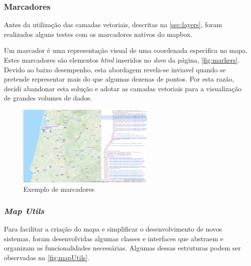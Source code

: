 \clearpage
\subsubsection{\textbf{Marcadores}}\label{sec:markers}
Antes da utilização das camadas vetoriais, descritas na \ref{sec:layers}, foram realizados alguns testes com os marcadores nativos do mapbox. 

Um marcador é uma representação visual de uma coordenada especifica no mapa. Estes marcadores são elementos \textit{html} inseridos no \textit{\acs{dom}} da página, \autoref{fig:markers}. Devido ao baixo desempenho, esta abordagem revela-se inviavel quando se pretende representar mais do que algumas dezenas de pontos. Por esta razão, decidi abandonar esta solução e adotar as camadas vetoriais para a visualização de grandes volumes de dados.

\begin{figure}[h!]
    \centering
    \includegraphics[width=0.6\textwidth]{figs/markers.png}
    \caption{Exemplo de marcadores}
    \label{fig:markers}
\end{figure}


\subsubsection{\textbf{\textit{Map Utils}}}\label{sec:mapUtils}
Para facilitar a criação do mapa e simplificar o desenvolvimento de novos sistemas, foram desenvolvidas algumas classes e interfaces que abstraem e organizam as funcionalidades necessárias. Algumas dessas estruturas podem ser observadas na \autoref{fig:mapUtils}.

